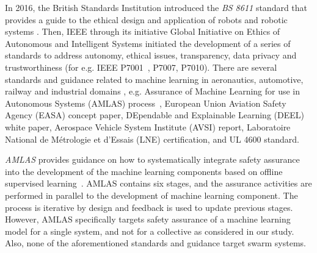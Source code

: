 \documentclass[runningheads]{llncs}
\begin{document}
In 2016, the British Standards Institution introduced the \emph{BS 8611} standard that provides a guide to the ethical design and application of robots and robotic systems \cite{BS8611}. 
Then, IEEE through its initiative Global Initiative on Ethics of Autonomous and Intelligent Systems initiated the development of a series of standards to address autonomy, ethical issues, transparency, data privacy and trustworthiness (for e.g. IEEE P7001~\cite{IEEE-P7001}, P7007, P7010). 
There are several standards and guidance related to machine learning in aeronautics, automotive, railway and industrial domains \cite{Kaakai2022}, e.g. Assurance of Machine Learning for use in Autonomous Systems (AMLAS) process~\cite{Hawkins2021}, European Union Aviation Safety Agency (EASA) concept paper, DEpendable and Explainable Learning (DEEL) white paper, Aerospace Vehicle System Institute (AVSI) report, Laboratoire National de Métrologie et d'Essais (LNE) certification, and UL 4600 standard. 

\emph{AMLAS} provides guidance on how to systematically integrate safety assurance into the development of the machine learning components based on offline supervised learning~\cite{Hawkins2021}. 
AMLAS contains six stages, and the assurance activities are performed in parallel to the development of machine learning component. 
The process is iterative by design and feedback is used to update previous stages. 
However, AMLAS specifically targets safety assurance of a machine learning model for a single system, and not for a collective as considered in our study. 
Also, none of the aforementioned standards and guidance target swarm systems. 
\end{document}
